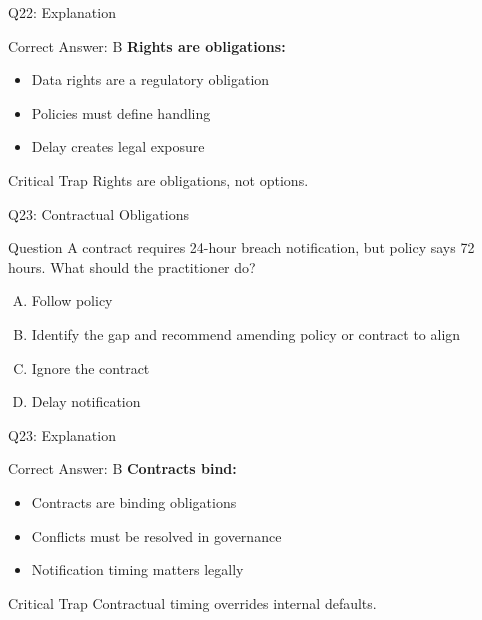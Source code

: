 \documentclass{beamer}
\begin{document}
	\begin{frame}{Q22: Explanation}
		\begin{block}{Correct Answer: B}
			\textbf{Rights are obligations:}
			\begin{itemize}
				\item Data rights are a regulatory obligation
				\item Policies must define handling
				\item Delay creates legal exposure
			\end{itemize}
		\end{block}
		\begin{alertblock}{Critical Trap}
			Rights are obligations, not options.
		\end{alertblock}
	\end{frame}
	
	\begin{frame}{Q23: Contractual Obligations}
		\begin{block}{Question}
			A contract requires 24-hour breach notification, but policy says 72 hours. What should the practitioner do?
		\end{block}
		\begin{enumerate}[(A)]
			\item Follow policy
			\item Identify the gap and recommend amending policy or contract to align
			\item Ignore the contract
			\item Delay notification
		\end{enumerate}
	\end{frame}
	
	\begin{frame}{Q23: Explanation}
		\begin{block}{Correct Answer: B}
			\textbf{Contracts bind:}
			\begin{itemize}
				\item Contracts are binding obligations
				\item Conflicts must be resolved in governance
				\item Notification timing matters legally
			\end{itemize}
		\end{block}
		\begin{alertblock}{Critical Trap}
			Contractual timing overrides internal defaults.
		\end{alertblock}
	\end{frame}
	
\end{document}
